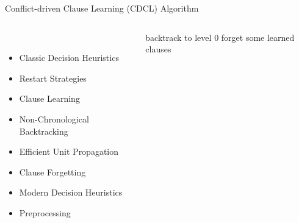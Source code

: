 \documentclass[t]{sdqbeamer}
\begin{document}
\begin{frame}{Conflict-driven Clause Learning (CDCL) Algorithm}
\vspace*{-1em}
\begin{columns}[T]
\begin{column}{.3\linewidth}
~\\[1em]
\begin{itemize}%
    \item Classic Decision Heuristics
    \item Restart Strategies
    \item Clause Learning
    \item Non-Chronological Backtracking
\end{itemize}
\begin{itemize}
    \item Efficient Unit Propagation
    \item Clause Forgetting
    \item Modern Decision Heuristics
    \item Preprocessing
\end{itemize}
\end{column}
\begin{column}{.6\linewidth}
\begin{algorithm}[H]
    \DontPrintSemicolon
    \caption{CDCL(CNF Formula $F$, \&Assignment A $\leftarrow \emptyset$)}
    

    
     {
        \Return \UNSAT
    }
     {
        \propagation\;
         {
             {
                \Return \UNSAT
            }
        }
        \lIf {\restart} {
            backtrack to level $0$
        }
        \lIf {\cleanup} {
            forget some learned clauses
        }
        \branching\;
    }
    \Return \SAT\;
\end{algorithm}
\end{column}
\end{columns}
\end{frame}
    
\end{document}
